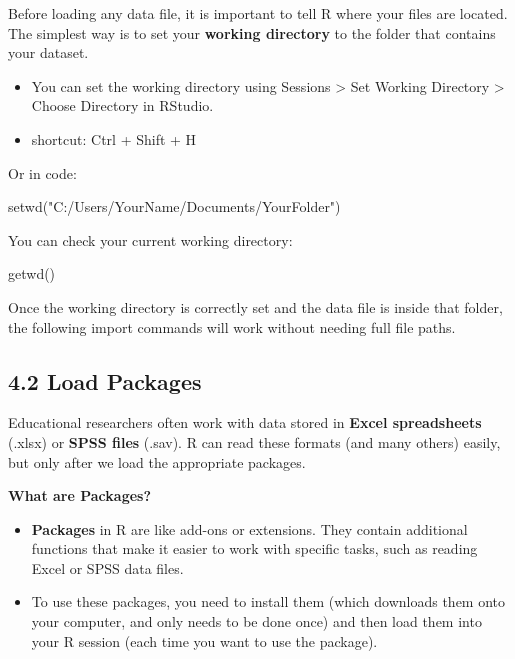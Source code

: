\documentclass[
  letterpaper,
  DIV=11,
  numbers=noendperiod]{scrreprt}
\newenvironment{Shaded}{\begin{snugshade}}{\end{snugshade}}
\newcommand{\NormalTok}[1]{\textcolor[rgb]{0.00,0.23,0.31}{#1}}
\begin{document}
Before loading any data file, it is important to tell R where your files
are located. The simplest way is to set your \textbf{working directory}
to the folder that contains your dataset.

\begin{itemize}
\item
  You can set the working directory using Sessions \textgreater{} Set
  Working Directory \textgreater{} Choose Directory in RStudio.
\item
  shortcut: Ctrl + Shift + H
\end{itemize}

Or in code:

\begin{Shaded}
\begin{Highlighting}[]
\NormalTok{setwd("C:/Users/YourName/Documents/YourFolder") }
\end{Highlighting}
\end{Shaded}

You can check your current working directory:

\begin{Shaded}
\begin{Highlighting}[]
\NormalTok{getwd() }
\end{Highlighting}
\end{Shaded}

Once the working directory is correctly set and the data file is inside
that folder, the following import commands will work without needing
full file paths.

\subsection*{4.2 Load Packages}\label{load-packages}

Educational researchers often work with data stored in \textbf{Excel
spreadsheets} (.xlsx) or \textbf{SPSS files} (.sav). R can read these
formats (and many others) easily, but only after we load the appropriate
packages.

\textbf{What are Packages?}

\begin{itemize}
\item
  \textbf{Packages} in R are like add-ons or extensions. They contain
  additional functions that make it easier to work with specific tasks,
  such as reading Excel or SPSS data files.
\item
  To use these packages, you need to install them (which downloads them
  onto your computer, and only needs to be done once) and then load them
  into your R session (each time you want to use the package).
\end{itemize}
\end{document}
